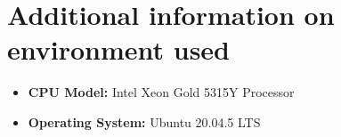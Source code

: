 \section{Additional information on environment used}
\begin{itemize}
    \small
    \item \textbf{CPU Model:} Intel Xeon Gold 5315Y Processor
    \item \textbf{Operating System:} Ubuntu 20.04.5 LTS
\end{itemize}